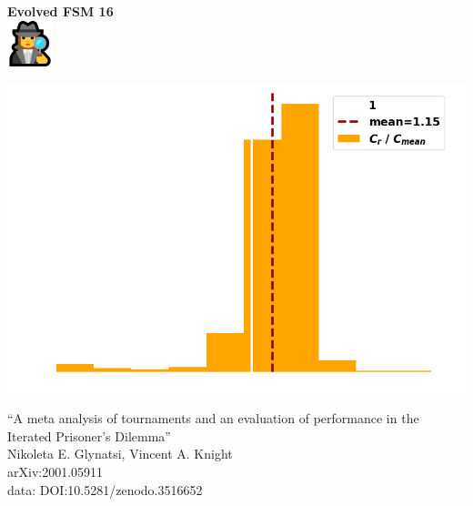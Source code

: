 \documentclass{beamer}
\begin{document}
\begin{frame}
    \begin{center}
    \Large{\textbf{Evolved FSM 16}} \\ \vspace{1cm}
    \includegraphics[width=0.1\textwidth]{static/detective.png}
    \end{center}
\end{frame}

\begin{frame}
    \begin{center}
        \includegraphics[width=.8\textwidth]{static/features.png}
    \end{center}
\end{frame}


\begin{frame}
    \begin{center}
        \large{``A meta analysis of tournaments and an evaluation of performance in the Iterated Prisoner's Dilemma''} \\ \vspace{.5cm}
        \footnotesize{Nikoleta E. Glynatsi, Vincent A. Knight} \\ \vspace{.5cm}
        \footnotesize{arXiv:2001.05911} \\ \vspace{.5cm}
        \footnotesize{data: DOI:10.5281/zenodo.3516652}
    \end{center}
\end{frame}
\end{document}
